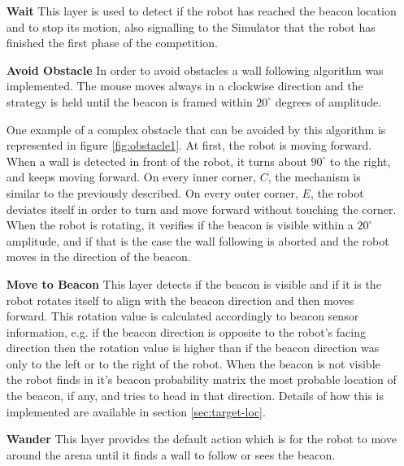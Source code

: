 \documentclass[oribibl]{llncs}
\begin{document}
\begin{itemize}
  \item[\textbf{Wait}]
  This layer is used to detect if the robot has reached the beacon location and to stop its motion, also signalling to the Simulator that the robot has finished the first phase of the competition.
  \item[\textbf{Avoid Obstacle}]
  In order to avoid obstacles a wall following algorithm was implemented. The mouse moves always in a clockwise direction and the strategy is held until the beacon is framed within $20^{\circ}$ degrees of amplitude.
  
  One example of a complex obstacle that can be avoided by this algorithm is represented in figure \ref{fig:obstacle1}. At first, the robot is moving forward. When a wall is detected in front of the robot, it turns about $90^{\circ}$ to the right, and keeps moving forward. On every inner corner, $C$, the mechanism is similar to the previously described. On every outer corner, $E$, the robot deviates itself in order to turn and move forward without touching the corner. When the robot is rotating, it verifies if the beacon is visible within a $20^{\circ}$ amplitude, and if that is the case the wall following is aborted and the robot moves in the direction of the beacon.
  
  \item[\textbf{Move to Beacon}]
  This layer detects if the beacon is visible and if it is the robot rotates itself to align with the beacon direction and then moves forward. This rotation value is calculated accordingly to beacon sensor information, e.g. if the beacon direction is opposite to the robot's facing direction then the rotation value is higher than if the beacon direction was only to the left or to the right of the robot.
  When the beacon is not visible the robot finds in it's beacon probability matrix the most
probable location of the beacon, if any, and tries to head in that direction. Details of how this is implemented are available in section \ref{sec:target-loc}.
  
  \item[\textbf{Wander}]
  This layer provides the default action which is for the robot to move around the arena until it finds a wall to follow or sees the beacon.
\end{itemize}
\hfill \\
\end{document}
